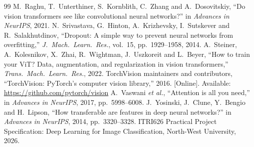 \documentclass[11pt,a4paper]{article}
\begin{document}
\begin{thebibliography}{99}
 M.~Raghu, T.~Unterthiner, S.~Kornblith, C.~Zhang and A.~Dosovitskiy, ``Do vision transformers see like convolutional neural networks?'' in \emph{Advances in NeurIPS}, 2021.
 N.~Srivastava, G.~Hinton, A.~Krizhevsky, I.~Sutskever and R.~Salakhutdinov, ``Dropout: A simple way to prevent neural networks from overfitting,'' \emph{J.\ Mach.\ Learn.\ Res.}, vol.~15, pp.~1929--1958, 2014.
 A.~Steiner, A.~Kolesnikov, X.~Zhai, R.~Wightman, J.~Uszkoreit and L.~Beyer, ``How to train your ViT? Data, augmentation, and regularization in vision transformers,'' \emph{Trans.\ Mach.\ Learn.\ Res.}, 2022.
 TorchVision maintainers and contributors, ``TorchVision: PyTorch's computer vision library,'' 2016. [Online]. Available: \url{https://github.com/pytorch/vision}
 A.~Vaswani \emph{et al.}, ``Attention is all you need,'' in \emph{Advances in NeurIPS}, 2017, pp.~5998--6008.
 J.~Yosinski, J.~Clune, Y.~Bengio and H.~Lipson, ``How transferable are features in deep neural networks?'' in \emph{Advances in NeurIPS}, 2014, pp.~3320--3328.
 ITRI626 Practical Project Specification: Deep Learning for Image Classification, North-West University, 2026.
\end{thebibliography}
\end{document}
